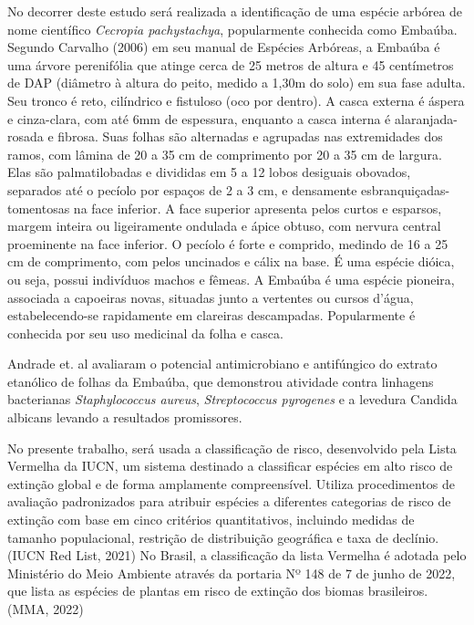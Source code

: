 No decorrer deste estudo será realizada a identificação de uma espécie arbórea de nome científico \textit{Cecropia pachystachya}, popularmente conhecida como Embaúba. Segundo Carvalho (2006) em seu manual de Espécies Arbóreas, a Embaúba é uma árvore perenifólia que atinge cerca de 25 metros de altura e 45 centímetros de DAP (diâmetro à altura do peito, medido a 1,30m do solo) em sua fase adulta. Seu tronco é reto, cilíndrico e fistuloso (oco por dentro). A casca externa é áspera e cinza-clara, com até 6mm de espessura, enquanto a casca interna é alaranjada-rosada e fibrosa. Suas folhas são alternadas e agrupadas nas extremidades dos ramos, com lâmina de 20 a 35 cm de comprimento por 20 a 35 cm de largura. Elas são palmatilobadas e divididas em 5 a 12 lobos desiguais obovados, separados até o pecíolo por espaços de 2 a 3 cm, e densamente esbranquiçadas-tomentosas na face inferior. A face superior apresenta pelos curtos e esparsos, margem inteira ou ligeiramente ondulada e ápice obtuso, com nervura central proeminente na face inferior. O pecíolo é forte e comprido, medindo de 16 a 25 cm de comprimento, com pelos uncinados e cálix na base. É uma espécie dióica, ou seja, possui indivíduos machos e fêmeas.\cite{carvalho2006embauba}
A Embaúba é uma espécie pioneira, associada a capoeiras novas, situadas junto a vertentes ou cursos d'água, estabelecendo-se rapidamente em clareiras descampadas. Popularmente é conhecida por seu uso medicinal da folha e casca. \cite{carvalho2006embauba}

Andrade et. al avaliaram o potencial antimicrobiano e antifúngico do extrato etanólico de folhas da Embaúba, que demonstrou atividade contra linhagens bacterianas \textit {Staphylococcus aureus}, \textit {Streptococcus pyrogenes} e a levedura Candida albicans levando a resultados promissores.\cite{de2021avaliaccao}

No presente trabalho, será usada a classificação de risco, desenvolvido pela Lista Vermelha da IUCN, um sistema destinado a classificar espécies em alto risco de extinção global e de forma amplamente compreensível. Utiliza procedimentos de avaliação padronizados para atribuir espécies a diferentes categorias de risco de extinção com base em cinco critérios quantitativos, incluindo medidas de tamanho populacional, restrição de distribuição geográfica e taxa de declínio.  (IUCN Red List, 2021)
No Brasil, a classificação da lista Vermelha é adotada pelo Ministério do Meio Ambiente através da portaria Nº 148 de 7 de junho de 2022, que lista as espécies de plantas em risco de extinção dos biomas brasileiros. (MMA, 2022)


